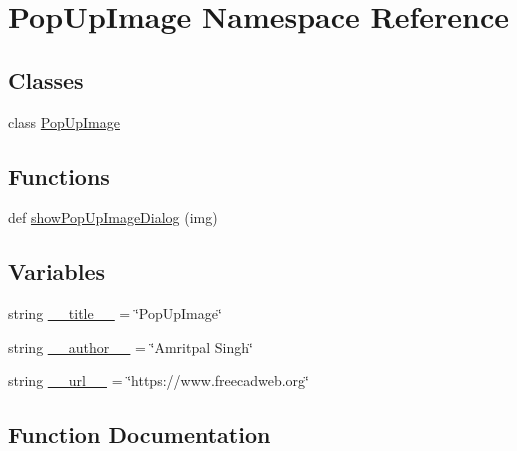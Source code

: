 \hypertarget{namespacePopUpImage}{}\section{Pop\+Up\+Image Namespace Reference}
\label{namespacePopUpImage}
\subsection*{Classes}
\begin{DoxyCompactItemize}
\item 
class \hyperlink{classPopUpImage_1_1PopUpImage}{Pop\+Up\+Image}
\end{DoxyCompactItemize}
\subsection*{Functions}
\begin{DoxyCompactItemize}
\item 
def \hyperlink{namespacePopUpImage_a8c565620d7de9b4882a44eacb870ad05}{show\+Pop\+Up\+Image\+Dialog} (img)
\end{DoxyCompactItemize}
\subsection*{Variables}
\begin{DoxyCompactItemize}
\item 
string \hyperlink{namespacePopUpImage_a4141c27e055e2d28a4b83ce4a05c56f1}{\+\_\+\+\_\+title\+\_\+\+\_\+} = \char`\"{}Pop\+Up\+Image\char`\"{}
\item 
string \hyperlink{namespacePopUpImage_ad3422bf98333fc29e0ca232e088d99c3}{\+\_\+\+\_\+author\+\_\+\+\_\+} = \char`\"{}Amritpal Singh\char`\"{}
\item 
string \hyperlink{namespacePopUpImage_a5c155cc535acd99cd7c1179185e9c857}{\+\_\+\+\_\+url\+\_\+\+\_\+} = \char`\"{}https\+://www.\+freecadweb.\+org\char`\"{}
\end{DoxyCompactItemize}


\subsection{Function Documentation}
